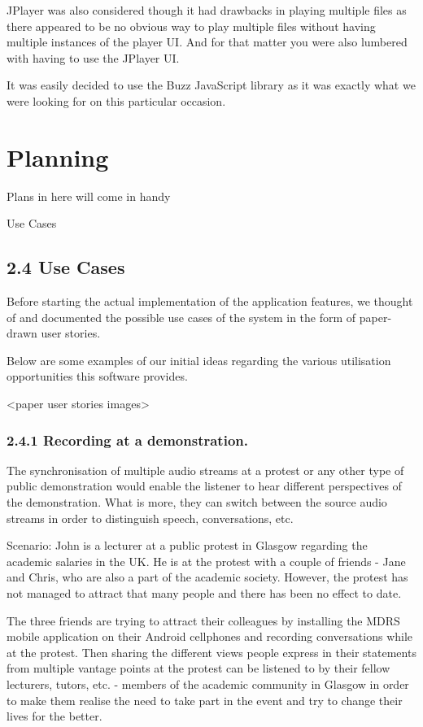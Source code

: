 \documentclass{l3proj}
\begin{document}
JPlayer was also considered though it had drawbacks in playing multiple files as there appeared to be no obvious way to play multiple files without having multiple instances of the player UI. And for that matter you were also lumbered with having to use the JPlayer UI.

It was easily decided to use the Buzz JavaScript library as it was exactly what we were looking for on this particular occasion.

\chapter{Planning}
\label{Planning}

Plans in here will come in handy


Use Cases

\section{2.4 Use Cases}

Before starting the actual implementation of the application features, we thought of and documented the possible use cases of the system in the form of paper-drawn user stories.

Below are some examples of our initial ideas regarding the various utilisation opportunities this software provides.

<paper user stories images>

\subsection{2.4.1 Recording at a demonstration.} The synchronisation of multiple audio streams at a protest or any other type of public demonstration would enable the listener to hear different perspectives of the demonstration. What is more, they can switch between the source audio streams in order to distinguish speech, conversations, etc.

Scenario: John is a lecturer at a public protest in Glasgow regarding the academic salaries in the UK. He is at the protest with a couple of friends - Jane and Chris, who are also a part of the academic society. However, the protest has not managed to attract that many people and there has been no effect to date.

The three friends are trying to attract their colleagues by installing the MDRS mobile application on their Android cellphones and recording conversations while at the protest. Then sharing the different views people express in their statements from multiple vantage points at the protest can be listened to by their fellow lecturers, tutors, etc. - members of the academic community in Glasgow in order to make them realise the need to take part in the event and try to change their lives for the better.
\end{document}
